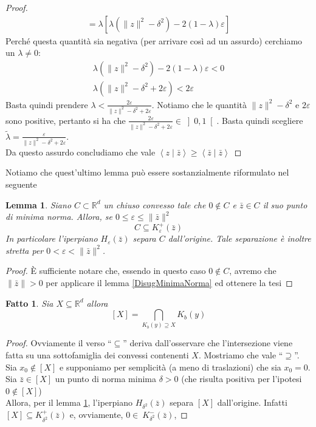 \documentclass[a4paper,12pt,italian]{article}
\newcommand{\Rd}{\mathbb{R}^d}
\newtheorem{lem}{Lemma}
\newtheorem{fatto}{Fatto}
\begin{document}
\begin{proof}
\begin{gather*}
=\lambda\left[\lambda(\|z\|^2-\delta^2)-2(1-\lambda)\varepsilon\right]
\end{gather*}
Perch\'e questa quantit\`a sia negativa (per arrivare cos\`i ad un assurdo) cerchiamo un $\lambda\neq0$:
\begin{gather*}
\lambda(\|z\|^2-\delta^2)-2(1-\lambda)\varepsilon<0\\
\lambda(\|z\|^2-\delta^2+2\varepsilon)<2\varepsilon
\end{gather*}
Basta quindi prendere $\lambda<\frac{2\varepsilon}{\|z\|^2-\delta^2+2\varepsilon}$. Notiamo che le quantit\`a
$\|z\|^2-\delta^2$ e $2\varepsilon$ sono positive, pertanto si ha che
$\frac{2\varepsilon}{\|z\|^2-\delta^2+2\varepsilon}\in\left]0,1\right[$.
Basta quindi scegliere $\tilde{\lambda}=\frac{\varepsilon}{\|z\|^2-\delta^2+2\varepsilon}$.\\
Da questo assurdo concludiamo che vale $\left<z\mid\bar{z}\right>\geq\left<\bar{z}\mid\bar{z}\right>$
\end{proof}
Notiamo che quest'ultimo lemma pu\`o essere sostanzialmente riformulato nel seguente
\begin{lem}
\label{SeparazZero}
Siano $C\subset\Rd$ un chiuso convesso tale che $0\notin C$ e $\bar{z}\in C$ il suo punto di minima norma. Allora,
se $0\leq\varepsilon\leq\|\bar{z}\|^2$
\begin{equation*}
C\subseteq K^+_\varepsilon(\bar{z})
\end{equation*}
In particolare l'iperpiano $H_\varepsilon(\bar{z})$ separa $C$ dall'origine. Tale separazione \`e inoltre stretta per
$0<\varepsilon<\|\bar{z}\|^2$.
\end{lem}
\begin{proof}
\`E sufficiente notare che, essendo in questo caso $0\notin C$, avremo che $\|\bar{z}\|>0$ per applicare il lemma \ref{DisugMinimaNorma}
ed ottenere la tesi
\end{proof}
\begin{fatto}
Sia $X\subseteq\Rd$ allora
\begin{equation*}
\left[X\right] = \bigcap_{K_b(y)\supseteq X}K_b(y)
\end{equation*}
\end{fatto}
\begin{proof}
Ovviamente il verso ``$\subseteq$'' deriva dall'osservare che l'intersezione viene fatta su una sottofamiglia dei convessi contenenti $X$.
Mostriamo che vale ``$\supseteq$''. Sia $x_0\notin\left[X\right]$ e supponiamo per semplicit\`a (a meno di traslazioni) che sia $x_0 = 0$.\\
Sia $\bar{z}\in\left[X\right]$ un punto di norma minima $\delta>0$ (che risulta positiva per l'ipotesi $0\notin\left[X\right]$)\\
Allora, per il lemma \ref{SeparazZero}, l'iperpiano $H_{\delta^2}(\bar{z})$ separa $\left[X\right]$ dall'origine.
Infatti $\left[X\right]\subseteq K^+_{\delta^2}(\bar{z})$ e, ovviamente, $0\in~K^-_{\delta^2}(\bar{z})$,
\end{proof}
\end{document}
